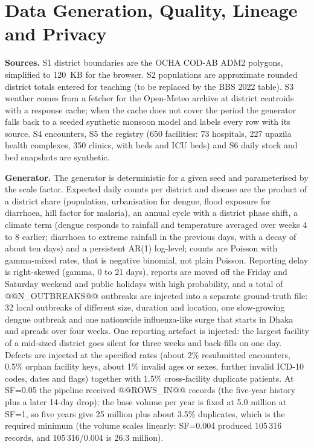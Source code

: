 \section{Data Generation, Quality, Lineage and Privacy}\label{sec:data}
\textbf{Sources.} S1 district boundaries are the OCHA COD-AB ADM2 polygons, simplified to 120~KB for the browser. S2 populations are approximate rounded district totals entered for teaching (to be replaced by the BBS 2022 table). S3 weather comes from a fetcher for the Open-Meteo archive at district centroids with a response cache; when the cache does not cover the period the generator falls back to a seeded synthetic monsoon model and labels every row with its source. S4 encounters, S5 the registry (650 facilities: 73 hospitals, 227 upazila health complexes, 350 clinics, with beds and ICU beds) and S6 daily stock and bed snapshots are synthetic.

\textbf{Generator.} The generator is deterministic for a given seed and parameterised by the scale factor. Expected daily counts per district and disease are the product of a district share (population, urbanisation for dengue, flood exposure for diarrhoea, hill factor for malaria), an annual cycle with a district phase shift, a climate term (dengue responds to rainfall and temperature averaged over weeks 4 to 8 earlier; diarrhoea to extreme rainfall in the previous days, with a decay of about ten days) and a persistent AR(1) log-level; counts are Poisson with gamma-mixed rates, that is negative binomial, not plain Poisson. Reporting delay is right-skewed (gamma, 0 to 21 days), reports are moved off the Friday and Saturday weekend and public holidays with high probability, and a total of @@N_OUTBREAKS@@ outbreaks are injected into a separate ground-truth file: 32 local outbreaks of different size, duration and location, one slow-growing dengue outbreak and one nationwide influenza-like surge that starts in Dhaka and spreads over four weeks. One reporting artefact is injected: the largest facility of a mid-sized district goes silent for three weeks and back-fills on one day. Defects are injected at the specified rates (about 2\% resubmitted encounters, 0.5\% orphan facility keys, about 1\% invalid ages or sexes, further invalid ICD-10 codes, dates and flags) together with 1.5\% cross-facility duplicate patients. At SF=0.05 the pipeline received @@ROWS_IN@@ records (the five-year history plus a later 14-day drop); the base volume per year is fixed at 5.0 million at SF=1, so five years give 25 million plus about 3.5\% duplicates, which is the required minimum (the volume scales linearly: SF=0.004 produced 105\,316 records, and 105\,316/0.004 is 26.3 million).

